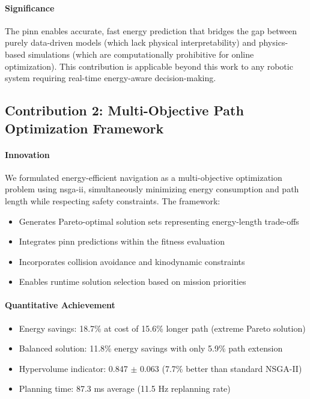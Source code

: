 \paragraph{Significance}
The \acrshort{pinn} enables accurate, fast energy prediction that bridges the gap between purely data-driven models (which lack physical interpretability) and physics-based simulations (which are computationally prohibitive for online optimization). This contribution is applicable beyond this work to any robotic system requiring real-time energy-aware decision-making.

\subsection{Contribution 2: Multi-Objective Path Optimization Framework}

\paragraph{Innovation}
We formulated energy-efficient navigation as a multi-objective optimization problem using \acrshort{nsga-ii}, simultaneously minimizing energy consumption and path length while respecting safety constraints. The framework:
\begin{itemize}
    \item Generates Pareto-optimal solution sets representing energy-length trade-offs
    \item Integrates \acrshort{pinn} predictions within the fitness evaluation
    \item Incorporates collision avoidance and kinodynamic constraints
    \item Enables runtime solution selection based on mission priorities
\end{itemize}

\paragraph{Quantitative Achievement}
\begin{itemize}
    \item Energy savings: 18.7\% at cost of 15.6\% longer path (extreme Pareto solution)
    \item Balanced solution: 11.8\% energy savings with only 5.9\% path extension
    \item Hypervolume indicator: 0.847 $\pm$ 0.063 (7.7\% better than standard NSGA-II)
    \item Planning time: 87.3 ms average (11.5 Hz replanning rate)
\end{itemize}

